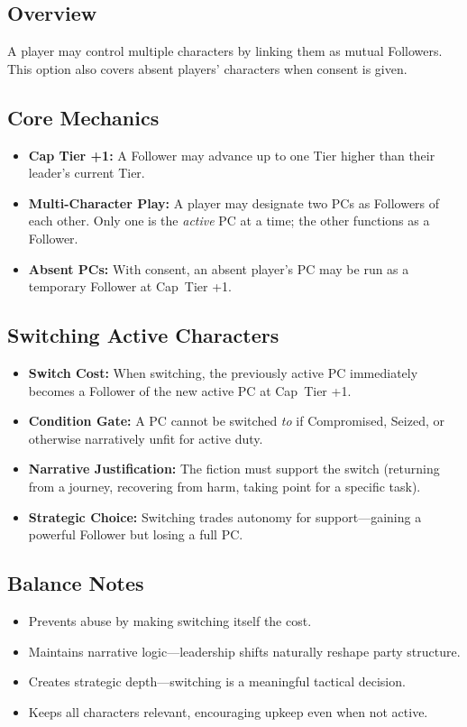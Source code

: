 \subsection*{Overview}
A player may control multiple characters by linking them as mutual Followers. This option also covers absent players' characters when consent is given.

\subsection*{Core Mechanics}
\begin{itemize}
  \item \textbf{Cap Tier +1:} A Follower may advance up to one Tier higher than their leader’s current Tier.
  \item \textbf{Multi-Character Play:} A player may designate two PCs as Followers of each other. Only one is the \emph{active} PC at a time; the other functions as a Follower.
  \item \textbf{Absent PCs:} With consent, an absent player’s PC may be run as a temporary Follower at Cap~Tier +1.
\end{itemize}

\subsection*{Switching Active Characters}
\label{sec:switching-active-characters}
\begin{itemize}
  \item \textbf{Switch Cost:} When switching, the previously active PC immediately becomes a Follower of the new active PC at Cap~Tier +1.  
  \item \textbf{Condition Gate:} A PC cannot be switched \emph{to} if Compromised, Seized, or otherwise narratively unfit for active duty.  
  \item \textbf{Narrative Justification:} The fiction must support the switch (returning from a journey, recovering from harm, taking point for a specific task).  
  \item \textbf{Strategic Choice:} Switching trades autonomy for support—gaining a powerful Follower but losing a full PC.  
\end{itemize}

\subsection*{Balance Notes}
\begin{itemize}
  \item Prevents abuse by making switching itself the cost.  
  \item Maintains narrative logic—leadership shifts naturally reshape party structure.  
  \item Creates strategic depth—switching is a meaningful tactical decision.  
  \item Keeps all characters relevant, encouraging upkeep even when not active.  
\end{itemize}